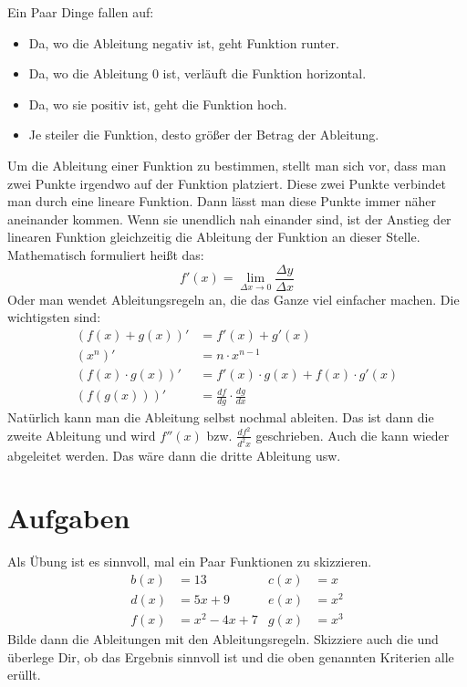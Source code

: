\documentclass[a4paper, twocolumn]{article}
\begin{document}
\begin{small}
\begin{center}
\end{center}
Ein Paar Dinge fallen auf:
\begin{itemize}
\itemsep0em
    \item Da, wo die Ableitung negativ ist, geht Funktion runter.
    \item Da, wo die Ableitung 0 ist, verläuft die Funktion horizontal.
    \item Da, wo sie positiv ist, geht die Funktion hoch.
    \item Je steiler die Funktion, desto größer der Betrag der Ableitung. 
\end{itemize}
Um die Ableitung einer Funktion zu bestimmen, stellt man sich vor, dass man zwei Punkte irgendwo auf der Funktion platziert. Diese zwei Punkte verbindet man durch eine lineare Funktion. Dann lässt man diese Punkte immer näher aneinander kommen. Wenn sie unendlich nah einander sind, ist der Anstieg der linearen Funktion gleichzeitig die Ableitung der Funktion an dieser Stelle. Mathematisch formuliert heißt das:
\begin{equation*}
    f'(x) = \lim\limits_{\Delta x \to 0}\frac{\Delta y}{\Delta x}
\end{equation*}
Oder man wendet Ableitungsregeln an, die das Ganze viel einfacher machen.
Die wichtigsten sind:
\begin{align*}
    (f(x)+g(x))' &= f'(x)+g'(x) \\ (x^n)'&=n\cdot x^{n-1}\\
    (f(x)\cdot g(x))' &= f'(x)\cdot g(x) + f(x) \cdot g'(x) \\ (f(g(x)))' &= \frac{df}{dg}\cdot \frac{dg}{dx} 
\end{align*}
Natürlich kann man die Ableitung selbst nochmal ableiten. Das ist dann die zweite Ableitung und wird $f''(x)$ bzw. $\frac{df^2}{d^2x}$ geschrieben. Auch die kann wieder abgeleitet werden. Das wäre dann die dritte Ableitung usw.
\end{small}
\section*{Aufgaben}
Als Übung ist es sinnvoll, mal ein Paar Funktionen zu skizzieren. 
\begin{align*}
    b(x) &= 13 & c(x) &= x \\
    d(x) &= 5x+9 & e(x)&= x^2\\ 
    f(x)&=x^2-4x+7 & g(x) &= x^3
\end{align*}
Bilde dann die Ableitungen mit den Ableitungsregeln. Skizziere auch die und überlege Dir, ob das Ergebnis sinnvoll ist und die oben genannten Kriterien alle erüllt.  


\end{document}
